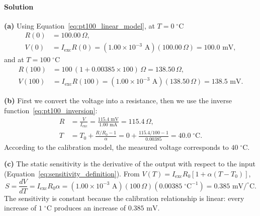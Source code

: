 \paragraph{Solution} \textbf{(a)} Using Equation~\eqref{eq:pt100_linear_model},
at $T = 0\;^\circ\text{C}$
\begin{align*}
R(0) &= 100.00\,\Omega, \\
V(0) &= I_{\text{exc}}R(0) = (1.00 \times 10^{-3}\text{ A})(100.00\,\Omega) = 100.0\text{ mV},
\end{align*}
and at $T = 100\;^\circ\text{C}$
\begin{align*}
R(100) &= 100\,(1 + 0.00385 \times 100)\,\Omega = 138.50\,\Omega, \\
V(100) &= I_{\text{exc}}R(100) = (1.00 \times 10^{-3}\text{ A})(138.50\,\Omega) = 138.5\text{ mV}.
\end{align*}

\textbf{(b)} First we convert the voltage into a resistance, then we use the inverse function~\eqref{eq:pt100_inversion}:
\begin{align*}
R &= \frac{V}{I_{\text{exc}}} = \frac{115.4\text{ mV}}{1.00\text{ mA}} = 115.4\,\Omega, \\
T &= T_0 + \frac{R/R_0 - 1}{\alpha} = 0 + \frac{115.4/100 - 1}{0.00385} = 40.0\;^\circ\text{C}.
\end{align*}
According to the calibration model, the measured voltage corresponds to $40\;^\circ\text{C}$.

\textbf{(c)} The static sensitivity is the derivative of the output with respect to the input (Equation~\eqref{eq:sensitivity_definition}). From $V(T) = I_{\text{exc}}R_0[1 + \alpha(T - T_0)]$,
\begin{equation*}
S = \frac{dV}{dT} = I_{\text{exc}}R_0\alpha = (1.00 \times 10^{-3}\text{ A})(100\,\Omega)(0.00385\;^\circ\text{C}^{-1}) = 0.385\text{ mV}/^\circ\text{C}.
\end{equation*}
The sensitivity is constant because the calibration relationship is linear: every increase of $1\;^\circ\text{C}$ produces an increase of $0.385\text{ mV}$.

